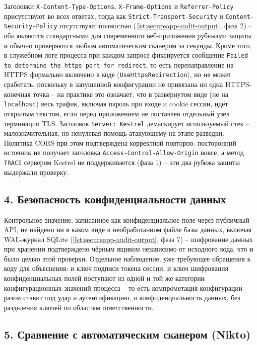 Заголовки \texttt{X-Content-Type-Options}, \texttt{X-Frame-Options} и
\texttt{Referrer-Policy} присутствуют во всех ответах, тогда как
\texttt{Strict-Transport-Security} и \texttt{Content-Security-Policy}
отсутствуют полностью (\autoref{lst:secureapp-audit-output}, фаза 2) --
оба являются стандартными для современного веб-приложения рубежами
защиты и обычно проверяются любым автоматическим сканером за секунды.
Кроме того, в служебном логе процесса при каждом запросе фиксируется
сообщение \texttt{Failed to determine the https port for redirect}, то
есть перенаправление на HTTPS формально включено в коде
(\texttt{UseHttpsRedirection}), но не может сработать, поскольку в
запущенной конфигурации не привязана ни одна HTTPS-конечная точка -- на
практике это означает, что в развёрнутом виде (не на \texttt{localhost})
весь трафик, включая пароль при входе и cookie сессии, идёт открытым
текстом, если перед приложением не поставлен отдельный узел терминации
TLS. Заголовок \texttt{Server: Kestrel} демаскирует используемый стек --
малозначительная, но ненулевая помощь атакующему на этапе разведки.
Политика CORS при этом подтверждена корректной повторно: посторонний
источник не получает заголовка
\texttt{Access-Control-Allow-Origin} вовсе, а метод \texttt{TRACE}
сервером Kestrel не поддерживается (фаза 1) -- эти два рубежа защиты
выдержали проверку.

\subsection*{4. Безопасность конфиденциальности данных}

Контрольное значение, записанное как конфиденциальное поле через
публичный API, не найдено ни в каком виде в необработанном файле базы
данных, включая WAL-журнал SQLite (\autoref{lst:secureapp-audit-output},
фаза 7) -- шифрование данных при хранении подтверждено чёрным ящиком
независимо от исходного кода, что и было целью этой проверки. Отдельное
наблюдение, уже требующее обращения к коду для объяснения: и ключ
подписи токена сессии, и ключ шифрования конфиденциальных полей
поступают из одной и той же категории конфигурационных значений
процесса -- то есть компрометация конфигурации разом ставит под удар и
аутентификацию, и конфиденциальность данных, без разделения ключей по
областям ответственности.

\subsection*{5. Сравнение с автоматическим сканером (Nikto)}

